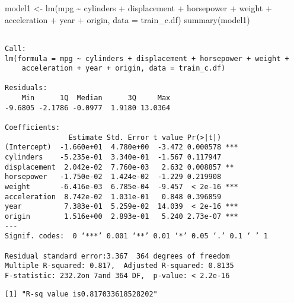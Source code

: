 \documentclass[
]{article}
\newenvironment{Shaded}{\begin{snugshade}}{\end{snugshade}}
\newcommand{\AttributeTok}[1]{\textcolor[rgb]{0.77,0.63,0.00}{#1}}
\newcommand{\FunctionTok}[1]{\textcolor[rgb]{0.00,0.00,0.00}{#1}}
\newcommand{\NormalTok}[1]{#1}
\newcommand{\OtherTok}[1]{\textcolor[rgb]{0.56,0.35,0.01}{#1}}
\newcommand{\SpecialCharTok}[1]{\textcolor[rgb]{0.00,0.00,0.00}{#1}}
\newcommand{\StringTok}[1]{\textcolor[rgb]{0.31,0.60,0.02}{#1}}
\begin{document}
\begin{Shaded}
\begin{Highlighting}[]

\NormalTok{model1 }\OtherTok{\textless{}{-}} \FunctionTok{lm}\NormalTok{(mpg }\SpecialCharTok{\textasciitilde{}}\NormalTok{ cylinders }\SpecialCharTok{+}\NormalTok{ displacement }\SpecialCharTok{+}\NormalTok{ horsepower }\SpecialCharTok{+}\NormalTok{ weight }\SpecialCharTok{+}\NormalTok{ acceleration }\SpecialCharTok{+}\NormalTok{ year }\SpecialCharTok{+}\NormalTok{ origin, }\AttributeTok{data =}\NormalTok{ train\_c.df)}
\FunctionTok{summary}\NormalTok{(model1)}
\end{Highlighting}
\end{Shaded}

\begin{verbatim}

Call:
lm(formula = mpg ~ cylinders + displacement + horsepower + weight + 
    acceleration + year + origin, data = train_c.df)

Residuals:
    Min      1Q  Median      3Q     Max 
-9.6805 -2.1786 -0.0977  1.9180 13.0364 

Coefficients:
               Estimate Std. Error t value Pr(>|t|)    
(Intercept)  -1.660e+01  4.780e+00  -3.472 0.000578 ***
cylinders    -5.235e-01  3.340e-01  -1.567 0.117947    
displacement  2.042e-02  7.760e-03   2.632 0.008857 ** 
horsepower   -1.750e-02  1.424e-02  -1.229 0.219908    
weight       -6.416e-03  6.785e-04  -9.457  < 2e-16 ***
acceleration  8.742e-02  1.031e-01   0.848 0.396859    
year          7.383e-01  5.259e-02  14.039  < 2e-16 ***
origin        1.516e+00  2.893e-01   5.240 2.73e-07 ***
---
Signif. codes:  0 ‘***’ 0.001 ‘**’ 0.01 ‘*’ 0.05 ‘.’ 0.1 ‘ ’ 1

Residual standard error:3.367  364 degrees of freedom
Multiple R-squared: 0.817,  Adjusted R-squared: 0.8135 
F-statistic: 232.2on 7and 364 DF,  p-value: < 2.2e-16
\end{verbatim}

\begin{Shaded}
\end{Shaded}

\begin{verbatim}
[1] "R-sq value is0.817033618528202"
\end{verbatim}
\end{document}
